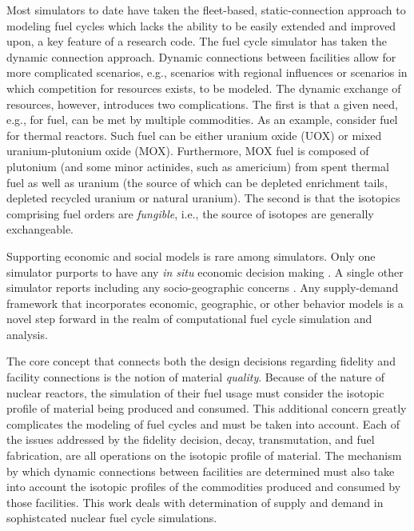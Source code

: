 Most simulators to date have taken the fleet-based, static-connection approach
to modeling fuel cycles which lacks the ability to be easily extended and
improved upon, a key feature of a research code. The \Cyclus fuel cycle
simulator has taken the dynamic connection approach. Dynamic connections between
facilities allow for more complicated scenarios, e.g., scenarios with regional
influences or scenarios in which competition for resources exists, to be
modeled. The dynamic exchange of resources, however, introduces two
complications. The first is that a given need, e.g., for fuel, can be met by
multiple commodities. As an example, consider fuel for thermal reactors. Such
fuel can be either uranium oxide (UOX) or mixed uranium-plutonium oxide
(MOX). Furthermore, MOX fuel is composed of plutonium (and some minor actinides,
such as americium) from spent thermal fuel as well as uranium (the source of
which can be depleted enrichment tails, depleted recycled uranium or natural
uranium). The second is that the isotopics comprising fuel orders are
\textit{fungible}, i.e., the source of isotopes are generally exchangeable.

Supporting economic and social models is rare among simulators. Only one
simulator purports to have any \textit{in situ} economic decision making
\cite{van_den_durpel_daness_2009}. A single other simulator reports including
any socio-geographic concerns \cite{andrianova_desae_2008}. Any supply-demand
framework that incorporates economic, geographic, or other behavior models is a
novel step forward in the realm of computational fuel cycle simulation and
analysis.

The core concept that connects both the design decisions regarding fidelity and
facility connections is the notion of material \textit{quality}. Because of the
nature of nuclear reactors, the simulation of their fuel usage must consider the
isotopic profile of material being produced and consumed. This additional
concern greatly complicates the modeling of fuel cycles and must be taken into
account. Each of the issues addressed by the fidelity decision, decay,
transmutation, and fuel fabrication, are all operations on the isotopic profile
of material. The mechanism by which dynamic connections between facilities are
determined must also take into account the isotopic profiles of the commodities
produced and consumed by those facilities. This work deals with determination of
supply and demand in sophistcated nuclear fuel cycle simulations.
